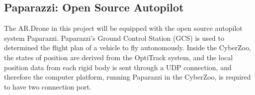 
\subsection{Paparazzi: Open Source Autopilot}
The AR.Drone in this project will be equipped with the open source autopilot system Paparazzi. Paparazzi's Ground Control Station (GCS) is used to determined the flight plan of a vehicle to fly autonomously. %
Inside the CyberZoo, the states of position are derived from the OptiTrack system, and the local position data from each rigid body is sent through a UDP connection, and therefore the computer platform, running Paparazzi in the CyberZoo, is required to have two connection port. 

